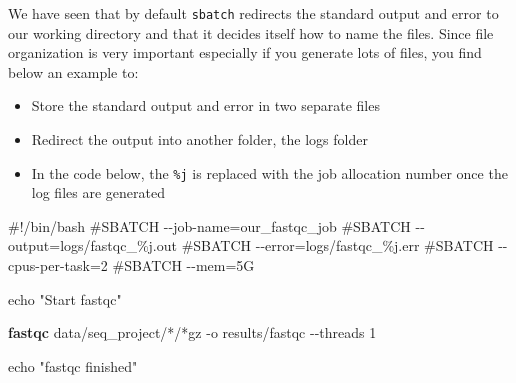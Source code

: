 \documentclass[
  letterpaper,
  DIV=11,
  numbers=noendperiod]{scrreprt}
\newenvironment{Shaded}{}{}
\newcommand{\AttributeTok}[1]{\textcolor[rgb]{0.84,0.23,0.29}{#1}}
\newcommand{\BuiltInTok}[1]{\textcolor[rgb]{0.84,0.23,0.29}{#1}}
\newcommand{\CommentTok}[1]{\textcolor[rgb]{0.42,0.45,0.49}{#1}}
\newcommand{\ExtensionTok}[1]{\textcolor[rgb]{0.84,0.23,0.29}{\textbf{#1}}}
\newcommand{\NormalTok}[1]{\textcolor[rgb]{0.14,0.16,0.18}{#1}}
\newcommand{\PreprocessorTok}[1]{\textcolor[rgb]{0.84,0.23,0.29}{#1}}
\newcommand{\StringTok}[1]{\textcolor[rgb]{0.01,0.18,0.38}{#1}}
\providecommand{\tightlist}{%
  \setlength{\itemsep}{0pt}\setlength{\parskip}{0pt}}\usepackage{longtable,booktabs,array}
\begin{document}
\begin{tcolorbox}[enhanced jigsaw, breakable, colback=white, arc=.35mm, colbacktitle=quarto-callout-tip-color!10!white, bottomtitle=1mm, opacitybacktitle=0.6, opacityback=0, rightrule=.15mm, leftrule=.75mm, left=2mm, toptitle=1mm, coltitle=black, title=\textcolor{quarto-callout-tip-color}{\faLightbulb}\hspace{0.5em}{Tip: sbatch and better log files}, bottomrule=.15mm, titlerule=0mm, colframe=quarto-callout-tip-color-frame, toprule=.15mm]

We have seen that by default \texttt{sbatch} redirects the standard
output and error to our working directory and that it decides itself how
to name the files. Since file organization is very important especially
if you generate lots of files, you find below an example to:

\begin{itemize}
\tightlist
\item
  Store the standard output and error in two separate files
\item
  Redirect the output into another folder, the logs folder
\item
  In the code below, the \texttt{\%j} is replaced with the job
  allocation number once the log files are generated
\end{itemize}

\begin{Shaded}
\begin{Highlighting}[]
\CommentTok{\#!/bin/bash}
\CommentTok{\#SBATCH {-}{-}job{-}name=our\_fastqc\_job}
\CommentTok{\#SBATCH {-}{-}output=logs/fastqc\_\%j.out}
\CommentTok{\#SBATCH {-}{-}error=logs/fastqc\_\%j.err}
\CommentTok{\#SBATCH {-}{-}cpus{-}per{-}task=2}
\CommentTok{\#SBATCH {-}{-}mem=5G}

\BuiltInTok{echo} \StringTok{"Start fastqc"}

\ExtensionTok{fastqc}\NormalTok{ data/seq\_project/}\PreprocessorTok{*}\NormalTok{/}\PreprocessorTok{*}\NormalTok{gz }\AttributeTok{{-}o}\NormalTok{ results/fastqc  }\AttributeTok{{-}{-}threads}\NormalTok{ 1}

\BuiltInTok{echo} \StringTok{"fastqc finished"}
\end{Highlighting}
\end{Shaded}

\end{tcolorbox}
\end{document}
